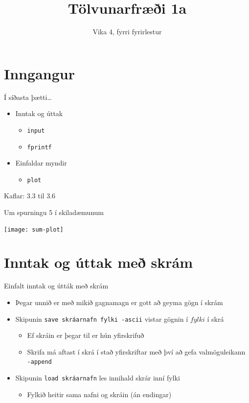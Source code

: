 \documentclass{beamer}
\title{Tölvunarfræði 1a}
\subtitle{Vika 4, fyrri fyrirlestur}
\begin{document}
\begin{frame}
\titlepage
\end{frame}

\section{Inngangur}


\begin{frame}{Í síðasta þætti\ldots}
\begin{itemize}
 \item Inntak og úttak
 \begin{itemize}
  \item \texttt{input}
  \item \texttt{fprintf}
 \end{itemize}
 \item Einfaldar myndir
 \begin{itemize}
  \item \texttt{plot}
 \end{itemize}
\end{itemize}
Kaflar: 3.3 til 3.6
\end{frame}

\begin{frame}{Um spurningu 5 í skiladæmunum}
\begin{center}
\texttt{[image: sum-plot]}
\end{center}

\end{frame}


\section{Inntak og úttak með skrám}

\begin{frame}{Einfalt inntak og útták með skrám}
\begin{itemize}
 \item Þegar unnið er með mikið gagnamagn er gott að geyma gögn í skrám
 \item Skipunin \texttt{save skráarnafn fylki -ascii} vistar gögnin í $fylki$ í skrá
 \begin{itemize}
  \item Ef skráin er þegar til er hún yfirskrifuð
  \item Skrifa má aftast í skrá í stað yfirskriftar með því að gefa valmöguleikann \texttt{-append}
 \end{itemize}
 \item Skipunin \texttt{load skráarnafn} les innihald skrár inní fylki
  \begin{itemize}
   \item Fylkið heitir sama nafni og skráin (án endingar)
  \end{itemize}
 \end{itemize}
\end{frame}
\end{document}
